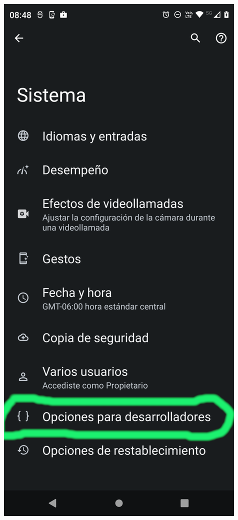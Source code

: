 \begin{frame}
\begin{columns}
\begin{center}
\end{center}
\begin{center}
\includegraphics[width=0.95\linewidth]{01_Configurar/ModoDesarrollador6.png}    

\end{center}
\end{columns}
\end{frame}

